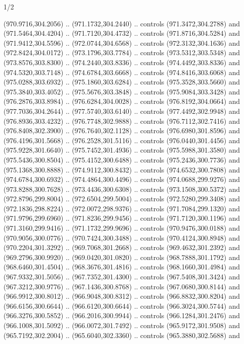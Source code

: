 \begin{flagdescription}{1/2}
\begin{scope}[xshift=0.75\flaglength,yshift=0.5\flagwidth,scale=0.00293\flagwidth]
\begin{scope}[scale=0.675,y=0.80pt, x=0.80pt,yscale=-1,xshift=-720,yshift=-240]
\begin{scope}[miter limit=4.80]
\begin{scope}[draw=black,fill=brown,line width=0.336\lw]
  (970.9716,304.2056) .. (971.1732,304.2440) .. controls (971.3472,304.2788) and
  (971.5464,304.4204) .. (971.7120,304.4732) .. controls (971.8716,304.5284) and
  (971.9412,304.5596) .. (972.0744,304.6568) .. controls (972.3132,304.1636) and
  (972.8424,304.0172) .. (973.1796,303.7784) .. controls (973.5312,303.5348) and
  (973.8576,303.8300) .. (974.2440,303.8336) .. controls (974.4492,303.8336) and
  (974.5320,303.7148) .. (974.6784,303.6668) .. controls (974.8416,303.6068) and
  (975.0288,303.6932) .. (975.1860,303.6284) .. controls (975.3528,303.5660) and
  (975.3840,303.4052) .. (975.5676,303.3848) .. controls (975.9084,303.3428) and
  (976.2876,303.8984) .. (976.6284,304.0028) .. controls (976.8192,304.0664) and
  (977.7036,304.2644) .. (977.5740,303.6140) .. controls (977.4492,302.9948) and
  (976.8936,303.4232) .. (976.7748,302.9888) .. controls (976.7112,302.7416) and
  (976.8408,302.3900) .. (976.7640,302.1128) .. controls (976.6980,301.8596) and
  (976.4196,301.5668) .. (976.2528,301.5116) .. controls (976.0440,301.4456) and
  (975.9228,301.6640) .. (975.7452,301.4936) .. controls (975.5988,301.3580) and
  (975.5436,300.8504) .. (975.4152,300.6488) .. controls (975.2436,300.7736) and
  (975.1368,300.8888) .. (974.9112,300.8432) .. controls (974.6532,300.7808) and
  (974.6784,300.6932) .. (974.4864,300.4496) .. controls (974.0688,299.9276) and
  (973.8288,300.7628) .. (973.4436,300.6308) .. controls (973.1508,300.5372) and
  (972.8796,299.8004) .. (972.6504,299.5004) .. controls (972.5280,299.3408) and
  (972.1836,298.8224) .. (972.0072,298.9376) .. controls (971.7084,299.1320) and
  (971.9796,299.6960) .. (971.8236,299.9456) .. controls (971.7120,300.1196) and
  (971.3160,299.9416) .. (971.1732,299.9696) .. controls (970.9476,300.0188) and
  (970.9056,300.0776) .. (970.7424,300.3488) .. controls (970.4124,300.8948) and
  (970.2204,301.3292) .. (969.7068,301.2668) .. controls (969.4632,301.2392) and
  (969.2796,300.9920) .. (969.0420,301.0820) .. controls (968.7888,301.1792) and
  (968.6460,301.4504) .. (968.3676,301.4816) .. controls (968.1660,301.4984) and
  (967.9332,301.5056) .. (967.7352,301.4300) .. controls (967.5408,301.3424) and
  (967.3212,300.9776) .. (967.1436,300.8768) .. controls (967.0680,300.8144) and
  (966.9912,300.8012) .. (966.9048,300.8312) .. controls (966.8832,300.8204) and
  (966.6156,300.6644) .. (966.6120,300.6644) .. controls (966.3024,300.5744) and
  (966.3276,300.5852) .. (966.2016,300.9944) .. controls (966.1284,301.2476) and
  (966.1008,301.5092) .. (966.0072,301.7492) .. controls (965.9172,301.9508) and
  (965.7192,302.2004) .. (965.6040,302.3360) .. controls (965.3880,302.5688) and

\end{scope}
\end{scope}
\end{scope}
\end{scope}
\end{flagdescription}
